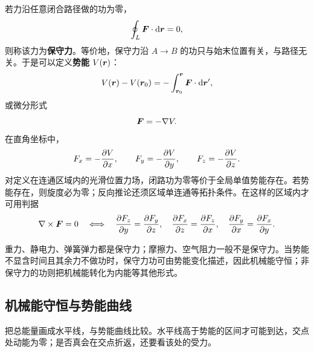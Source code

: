 若力沿任意闭合路径做的功为零，
\begin{equation}
\oint_L \boldsymbol{F}\cdot\mathrm{d}\boldsymbol{r}=0,
\label{eq:conservative-loop}
\end{equation}
则称该力为\textbf{保守力}。等价地，保守力沿 $A\to B$ 的功只与始末位置有关，与路径无关。于是可以定义\textbf{势能} $V(\boldsymbol{r})$：
\begin{equation}
V(\boldsymbol{r})-V(\boldsymbol{r}_0)=-\int_{\boldsymbol{r}_0}^{\boldsymbol{r}}\boldsymbol{F}\cdot\mathrm{d}\boldsymbol{r}',
\label{eq:potential}
\end{equation}
或微分形式
\begin{equation}
\boldsymbol{F}=-\nabla V .
\label{eq:force-potential}
\end{equation}
在直角坐标中，
\begin{equation}
F_x=-\frac{\partial V}{\partial x},\qquad F_y=-\frac{\partial V}{\partial y},\qquad F_z=-\frac{\partial V}{\partial z}.
\end{equation}
对定义在连通区域内的光滑位置力场，闭路功为零等价于全局单值势能存在。若势能存在，则旋度必为零；反向推论还须区域单连通等拓扑条件。在这样的区域内才可用判据
\begin{equation}
\nabla\times\boldsymbol{F}=0
\quad\Longleftrightarrow\quad
\frac{\partial F_z}{\partial y}=\frac{\partial F_y}{\partial z},\quad
\frac{\partial F_x}{\partial z}=\frac{\partial F_z}{\partial x},\quad
\frac{\partial F_y}{\partial x}=\frac{\partial F_x}{\partial y}.
\label{eq:curl-zero}
\end{equation}

\begin{physicsbox}
重力、静电力、弹簧弹力都是保守力；摩擦力、空气阻力一般不是保守力。当势能不显含时间且其余力不做功时，保守力功可由势能变化描述，因此机械能守恒；非保守力的功则把机械能转化为内能等其他形式。
\end{physicsbox}

\subsection{机械能守恒与势能曲线}

把总能量画成水平线，与势能曲线比较。水平线高于势能的区间才可能到达，交点处动能为零；是否真会在交点折返，还要看该处的受力。

